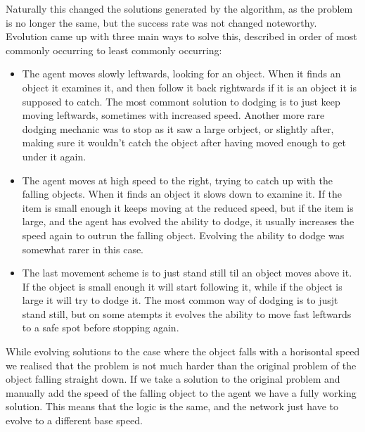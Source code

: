 \documentclass[a4paper,12pt]{article}
\begin{document}
Naturally this changed the solutions generated by the algorithm, as the problem is no longer the same, but the success rate was not changed noteworthy. Evolution came up with three main ways to solve this, described in order of most commonly occurring to least commonly occurring:
\begin{itemize}
\item{The agent moves slowly leftwards, looking for an object. When it finds an object it examines it, and then follow it back rightwards if it is an object it is supposed to catch. The most commont solution to dodging is to just keep moving leftwards, sometimes with increased speed. Another more rare dodging mechanic was to stop as it saw a large orbject, or slightly after, making sure it wouldn't catch the object after having moved enough to get under it again.}
\item{The agent moves at high speed to the right, trying to catch up with the falling objects. When it finds an object it slows down to examine it. If the item is small enough it keeps moving at the reduced speed, but if the item is large, and the agent has evolved the ability to dodge, it usually increases the speed again to outrun the falling object. Evolving the ability to dodge was somewhat rarer in this case.}
\item{The last movement scheme is to just stand still til an object moves above it. If the object is small enough it will start following it, while if the object is large it will try to dodge it. The most common way of dodging is to jusjt stand still, but on some atempts it evolves the ability to move fast leftwards to a safe spot before stopping again.}
\end{itemize}
While evolving solutions to the case where the object falls with a horisontal speed we realised that the problem is not much harder than the original problem of the object falling straight down. If we take a solution to the original problem and manually add the speed of the falling object to the agent we have a fully working solution. This means that the logic is the same, and the network just have to evolve to a different base speed.
\end{document}
